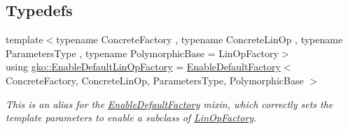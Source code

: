 \subsection*{Typedefs}
\begin{DoxyCompactItemize}
\item 
{\footnotesize template$<$typename Concrete\+Factory , typename Concrete\+Lin\+Op , typename Parameters\+Type , typename Polymorphic\+Base  = Lin\+Op\+Factory$>$ }\\using \hyperlink{group__LinOp_ga24628d477cba68b31cea690572c51912}{gko\+::\+Enable\+Default\+Lin\+Op\+Factory} = \hyperlink{classgko_1_1EnableDefaultFactory}{Enable\+Default\+Factory}$<$ Concrete\+Factory, Concrete\+Lin\+Op, Parameters\+Type, Polymorphic\+Base $>$
\begin{DoxyCompactList}\small\item\em This is an alias for the \hyperlink{classgko_1_1EnableDefaultFactory}{Enable\+Default\+Factory} mixin, which correctly sets the template parameters to enable a subclass of \hyperlink{classgko_1_1LinOpFactory}{Lin\+Op\+Factory}. \end{DoxyCompactList}\end{DoxyCompactItemize}

